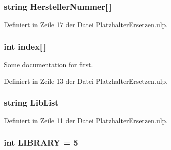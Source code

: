 \hypertarget{_platzhalter_ersetzen_8ulp_a6ba91b18d0979e207105d660a2010d8d}{}
\subsubsection[{Hersteller\+Nummer}]{\setlength{\rightskip}{0pt plus 5cm}string Hersteller\+Nummer\mbox{[}$\,$\mbox{]}}\label{_platzhalter_ersetzen_8ulp_a6ba91b18d0979e207105d660a2010d8d}


Definiert in Zeile 17 der Datei Platzhalter\+Ersetzen.\+ulp.

\hypertarget{_platzhalter_ersetzen_8ulp_ae529cfd688d748de42fa805b2c306253}{}
\subsubsection[{index}]{\setlength{\rightskip}{0pt plus 5cm}int index\mbox{[}$\,$\mbox{]}}\label{_platzhalter_ersetzen_8ulp_ae529cfd688d748de42fa805b2c306253}
Some documentation for first. 

Definiert in Zeile 13 der Datei Platzhalter\+Ersetzen.\+ulp.

\hypertarget{_platzhalter_ersetzen_8ulp_a991ec8cb88018f637ba0c4aa34c7fdd3}{}
\subsubsection[{Lib\+List}]{\setlength{\rightskip}{0pt plus 5cm}string Lib\+List}\label{_platzhalter_ersetzen_8ulp_a991ec8cb88018f637ba0c4aa34c7fdd3}


Definiert in Zeile 11 der Datei Platzhalter\+Ersetzen.\+ulp.

\hypertarget{_platzhalter_ersetzen_8ulp_a24327f241c43e49fd9913294c6d7ddb3}{}
\subsubsection[{L\+I\+B\+R\+A\+R\+Y}]{\setlength{\rightskip}{0pt plus 5cm}int L\+I\+B\+R\+A\+R\+Y = 5}\label{_platzhalter_ersetzen_8ulp_a24327f241c43e49fd9913294c6d7ddb3}


